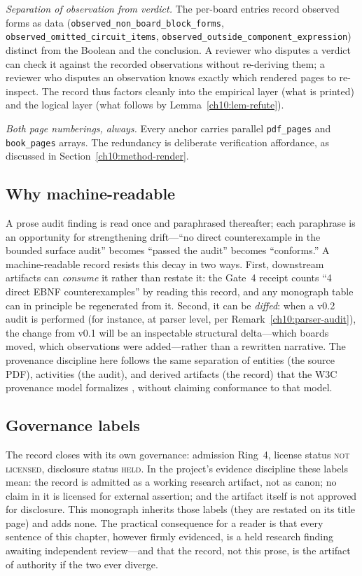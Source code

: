 \emph{Separation of observation from verdict.} The per-board entries record observed forms as data (\texttt{observed\_non\_board\_block\_forms}, \texttt{observed\_omitted\_circuit\_items}, \texttt{observed\_outside\_component\_expression}) distinct from the Boolean and the conclusion. A reviewer who disputes a verdict can check it against the recorded observations without re-deriving them; a reviewer who disputes an observation knows exactly which rendered pages to re-inspect. The record thus factors cleanly into the empirical layer (what is printed) and the logical layer (what follows by Lemma~\ref{ch10:lem-refute}).

\emph{Both page numberings, always.} Every anchor carries parallel \texttt{pdf\_pages} and \texttt{book\_pages} arrays. The redundancy is deliberate verification affordance, as discussed in Section~\ref{ch10:method-render}.

\subsection{Why machine-readable}

A prose audit finding is read once and paraphrased thereafter; each paraphrase is an opportunity for strengthening drift---``no direct counterexample in the bounded surface audit'' becomes ``passed the audit'' becomes ``conforms.'' A machine-readable record resists this decay in two ways. First, downstream artifacts can \emph{consume} it rather than restate it: the Gate~4 receipt counts ``4 direct EBNF counterexamples'' by reading this record, and any monograph table can in principle be regenerated from it. Second, it can be \emph{diffed}: when a v0.2 audit is performed (for instance, at parser level, per Remark~\ref{ch10:parser-audit}), the change from v0.1 will be an inspectable structural delta---which boards moved, which observations were added---rather than a rewritten narrative. The provenance discipline here follows the same separation of entities (the source PDF), activities (the audit), and derived artifacts (the record) that the W3C provenance model formalizes \cite{prov}, without claiming conformance to that model.

\subsection{Governance labels}

The record closes with its own governance: admission Ring~4, license status \textsc{not licensed}, disclosure status \textsc{held}. In the project's evidence discipline these labels mean: the record is admitted as a working research artifact, not as canon; no claim in it is licensed for external assertion; and the artifact itself is not approved for disclosure. This monograph inherits those labels (they are restated on its title page) and adds none. The practical consequence for a reader is that every sentence of this chapter, however firmly evidenced, is a held research finding awaiting independent review---and that the record, not this prose, is the artifact of authority if the two ever diverge.


